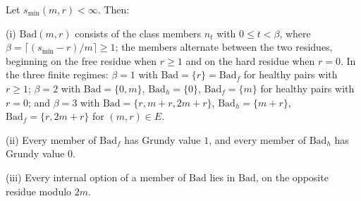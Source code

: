 \begin{proposition}\label{prop:bad}
Let $s_{\min}(m,r) < \infty$. Then:

(i) $\mathrm{Bad}(m,r)$ consists of the class members $n_t$ with
$0 \le t < \beta$, where $\beta = \lceil (s_{\min} - r)/m \rceil \ge 1$;
the members alternate between the two residues, beginning on the free
residue when $r \ge 1$ and on the hard residue when $r = 0$. In the three
finite regimes: $\beta = 1$ with $\mathrm{Bad} = \{r\} = \mathrm{Bad}_f$
for healthy pairs with $r \ge 1$; $\beta = 2$ with
$\mathrm{Bad} = \{0, m\}$, $\mathrm{Bad}_h = \{0\}$,
$\mathrm{Bad}_f = \{m\}$ for healthy pairs with $r = 0$; and $\beta = 3$
with $\mathrm{Bad} = \{r, m+r, 2m+r\}$, $\mathrm{Bad}_h = \{m+r\}$,
$\mathrm{Bad}_f = \{r, 2m+r\}$ for $(m,r) \in E$.

(ii) Every member of $\mathrm{Bad}_f$ has Grundy value $1$, and every
member of $\mathrm{Bad}_h$ has Grundy value $0$.

(iii) Every internal option of a member of $\mathrm{Bad}$ lies in
$\mathrm{Bad}$, on the opposite residue modulo $2m$.
\end{proposition}
